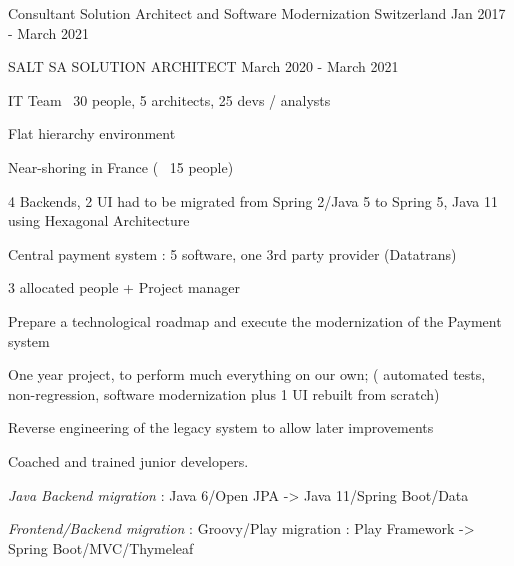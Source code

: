 \begin{cventries}
        \cventry
        {Consultant} %
        {Solution Architect and Software Modernization} %
        {Switzerland} %
        {Jan 2017 - March 2021} %
        {}
        \cventry
        {} %
        {} %
        {} %
        {} %
        {
            \globalexperience
            {SALT SA} %
            {SOLUTION ARCHITECT} %
            {March 2020 - March 2021} %
            {
            \begin{cvitems} %
                \item{IT Team ~30 people, 5 architects, 25 devs / analysts}
                \item{Flat hierarchy environment}
                \item{Near-shoring in France ( ~15 people)}
                \item{4 Backends, 2 UI had to be migrated from Spring 2/Java 5 to Spring 5, Java 11 using Hexagonal Architecture}
                \item{Central payment system : 5 software, one 3rd party provider (Datatrans)}
                \item{3 allocated people + Project manager}
            \end{cvitems}
            }
            {
            \begin{cvitems} %
                \item{Prepare a technological roadmap and execute  the modernization of the Payment system}
                \item{One year project, to perform much everything on our own; ( automated tests, non-regression, software modernization plus 1 UI rebuilt from scratch)}
                \item{Reverse engineering of the legacy system to allow later improvements}
                \item{Coached and trained junior developers.}
            \end{cvitems}
            }
            {
            \begin{cvitems} %
                \item{\emph{Java Backend migration} : Java 6/Open JPA -> Java 11/Spring Boot/Data}
                \item{\emph{Frontend/Backend migration} : Groovy/Play migration : Play Framework -> Spring Boot/MVC/Thymeleaf}

\end{cvitems}}}
\end{cventries}
